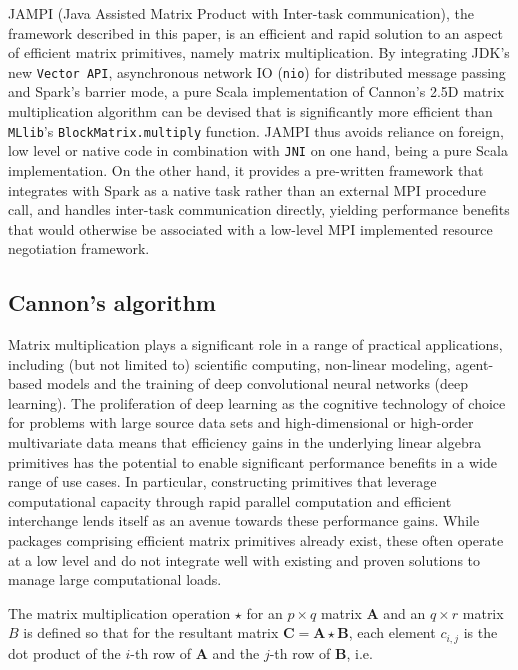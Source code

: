\documentclass[fleqn,10pt]{SelfArx} %
\begin{document}
JAMPI (Java Assisted Matrix Product with Inter-task communication), the framework described in this paper, is an efficient and rapid solution to an aspect of efficient matrix primitives, namely matrix multiplication. By integrating JDK's new \texttt{Vector API}, asynchronous network IO (\texttt{nio}) for distributed message passing and Spark's barrier mode, a pure Scala implementation of Cannon's 2.5D matrix multiplication algorithm can be devised that is significantly more efficient than \texttt{MLlib}'s \texttt{BlockMatrix.multiply} function. JAMPI thus avoids reliance on foreign, low level or native code in combination with \texttt{JNI} on one hand, being a pure Scala implementation. On the other hand, it provides a pre-written framework that integrates with Spark as a native task rather than an external MPI procedure call, and handles inter-task communication directly, yielding performance benefits that would otherwise be associated with a low-level MPI implemented resource negotiation framework.

\subsection{Cannon's algorithm} %
\label{sub:cannon_s_algorithm}

Matrix multiplication plays a significant role in a range of practical applications, including (but not limited to) scientific computing, non-linear modeling, agent-based models and the training of deep convolutional neural networks (deep learning). The proliferation of deep learning as the cognitive technology of choice for problems with large source data sets and high-dimensional or high-order multivariate data means that efficiency gains in the underlying linear algebra primitives has the potential to enable significant performance benefits in a wide range of use cases. In particular, constructing primitives that leverage computational capacity through rapid parallel computation and efficient interchange lends itself as an avenue towards these performance gains. While packages comprising efficient matrix primitives already exist,\cite{chetlur2014cudnn} these often operate at a low level and do not integrate well with existing and proven solutions to manage large computational loads.


The matrix multiplication operation $\star$ for an $p \times q$ matrix $\mathbf{A}$ and an $q \times r$ matrix $B$ is defined so that for the resultant matrix $\mathbf{C} = \mathbf{A} \star \mathbf{B}$, each element $c_{i, j}$ is the dot product of the $i$-th row of $\mathbf{A}$ and the $j$-th row of $\mathbf{B}$, i.e.
\end{document}
